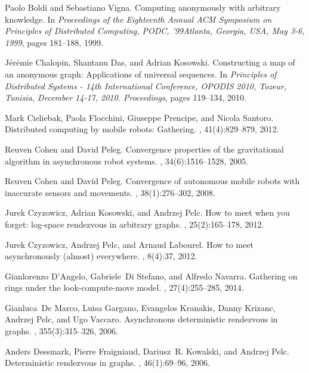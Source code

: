 \documentclass[11pt]{article}
\begin{document}
\begin{thebibliography}{10}
Paolo Boldi and Sebastiano Vigna.
\newblock Computing anonymously with arbitrary knowledge.
\newblock In {\em Proceedings of the Eighteenth Annual {ACM} Symposium on
  Principles of Distributed Computing, PODC, '99Atlanta, Georgia, USA, May 3-6,
  1999}, pages 181--188, 1999.


J{\'{e}}r{\'{e}}mie Chalopin, Shantanu Das, and Adrian Kosowski.
\newblock Constructing a map of an anonymous graph: Applications of universal
  sequences.
\newblock In {\em Principles of Distributed Systems - 14th International
  Conference, {OPODIS} 2010, Tozeur, Tunisia, December 14-17, 2010.
  Proceedings}, pages 119--134, 2010.
  


Mark Cieliebak, Paola Flocchini, Giuseppe Prencipe, and Nicola Santoro.
\newblock Distributed computing by mobile robots: Gathering.
, 41(4):829--879, 2012.

Reuven Cohen and David Peleg.
\newblock Convergence properties of the gravitational algorithm in asynchronous
  robot systems.
, 34(6):1516--1528, 2005.

Reuven Cohen and David Peleg.
\newblock Convergence of autonomous mobile robots with inaccurate sensors and
  movements.
, 38(1):276--302, 2008.

Jurek Czyzowicz, Adrian Kosowski, and Andrzej Pelc.
\newblock How to meet when you forget: log-space rendezvous in arbitrary
  graphs.
, 25(2):165--178, 2012.

Jurek Czyzowicz, Andrzej Pelc, and Arnaud Labourel.
\newblock How to meet asynchronously (almost) everywhere.
, 8(4):37, 2012.

Gianlorenzo D'Angelo, Gabriele~Di Stefano, and Alfredo Navarra.
\newblock Gathering on rings under the look-compute-move model.
, 27(4):255--285, 2014.

Gianluca~De Marco, Luisa Gargano, Evangelos Kranakis, Danny Krizanc, Andrzej
  Pelc, and Ugo Vaccaro.
\newblock Asynchronous deterministic rendezvous in graphs.
, 355(3):315--326, 2006.


Anders Dessmark, Pierre Fraigniaud, Dariusz~R. Kowalski, and Andrzej Pelc.
\newblock Deterministic rendezvous in graphs.
, 46(1):69--96, 2006.


\end{thebibliography}
\end{document}
